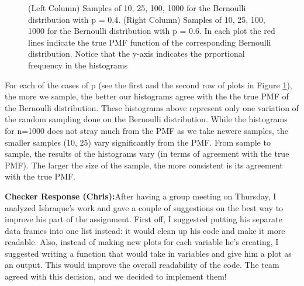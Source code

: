 \documentclass{article}\usepackage[]{graphicx}\usepackage[]{color}
\begin{document}
\begin{enumerate}
\begin{enumerate}
\begin{figure}[H]
\begin{center}
    \caption{(Left Column) Samples of 10, 25, 100, 1000 for the Bernoulli distribution with p = 0.4. (Right Column) Samples of 10, 25, 100, 1000 for the Bernoulli distribution with p = 0.6. In each plot the red lines indicate the true PMF function of the corresponding Bernoulli distribution. Notice that the y-axis indicates the prportional frequency in the histograms}
    \label{P3fig_3} %
  \end{center}
\end{figure}
	\end{enumerate}
	For each of the cases of p (see the first and the second row of plots in Figure \ref{P3fig_3}), the more we sample, the better our histograms agree with the the true PMF of the Bernoulli distribution. These histograms above represent only one variation of the random sampling done on the Bernoulli distribution. While the histograms for n=1000 does not stray much from the PMF as we take newere samples, the smaller samples (10, 25) vary significantly from the PMF. From sample to sample, the results of the histograms vary (in terms of agreement with the true PMF). The larger the size of the sample, the more consistent is its agreement with the true PMF. 
	
\textbf{Checker Response (Chris):}After having a group meeting on Thursday, I analyzed Ishraque's work and gave a couple of suggestions on the best way to improve his part of the assignment. First off, I suggested putting his separate data frames into one list instead: it would clean up his code and make it more readable. Also, instead of making new plots for each variable he's creating, I suggested writing a function that would take in variables and give him a plot as an output. This would improve the overall readability of the code. The team agreed with this decision, and we decided to implement them!
	

\end{enumerate}
\end{document}

